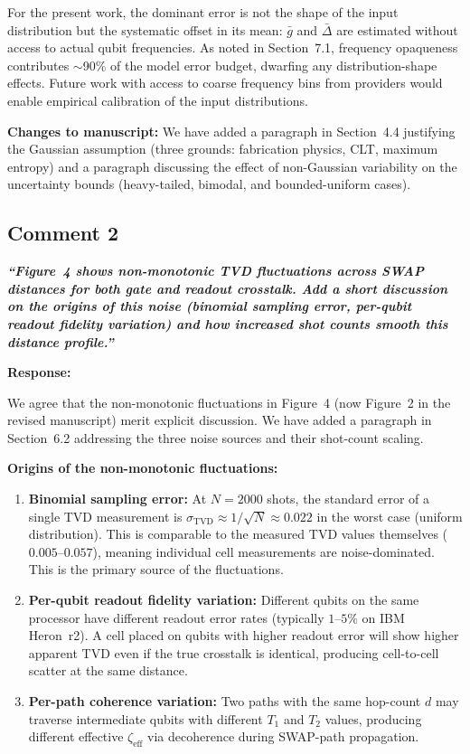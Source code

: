 \documentclass[11pt,a4paper]{article}
\begin{document}
For the present work, the dominant error is not the shape of the input distribution but the
systematic offset in its mean: $\bar{g}$ and $\bar{\Delta}$ are estimated without access to
actual qubit frequencies. As noted in Section~7.1, frequency opaqueness contributes
$\sim$90\% of the model error budget, dwarfing any distribution-shape effects. Future work
with access to coarse frequency bins from providers would enable empirical calibration of
the input distributions.

\medskip\noindent\textbf{Changes to manuscript:} We have added a paragraph in Section~4.4
justifying the Gaussian assumption (three grounds: fabrication physics, CLT, maximum
entropy) and a paragraph discussing the effect of non-Gaussian variability on the
uncertainty bounds (heavy-tailed, bimodal, and bounded-uniform cases).

\subsection*{Comment 2}

\noindent\textbf{\textit{``Figure~4 shows non-monotonic TVD fluctuations across SWAP
distances for both gate and readout crosstalk. Add a short discussion on the origins of
this noise (binomial sampling error, per-qubit readout fidelity variation) and how
increased shot counts smooth this distance profile.''}}

\medskip\noindent\textbf{Response:}

We agree that the non-monotonic fluctuations in Figure~4 (now Figure~2 in the revised
manuscript) merit explicit discussion. We have added a paragraph in Section~6.2 addressing
the three noise sources and their shot-count scaling.

\medskip\noindent\textbf{Origins of the non-monotonic fluctuations:}

\begin{enumerate}[leftmargin=*]
    \item \textbf{Binomial sampling error:} At $N = 2000$ shots, the standard error of a
    single TVD measurement is $\sigma_{\mathrm{TVD}} \approx 1/\sqrt{N} \approx 0.022$ in
    the worst case (uniform distribution). This is comparable to the measured TVD values
    themselves ($0.005$--$0.057$), meaning individual cell measurements are noise-dominated.
    This is the primary source of the fluctuations.
    \item \textbf{Per-qubit readout fidelity variation:} Different qubits on the same
    processor have different readout error rates (typically $1$--$5\%$ on IBM Heron~r2).
    A cell placed on qubits with higher readout error will show higher apparent TVD even if
    the true crosstalk is identical, producing cell-to-cell scatter at the same distance.
    \item \textbf{Per-path coherence variation:} Two paths with the same hop-count $d$ may
    traverse intermediate qubits with different $T_1$ and $T_2$ values, producing different
    effective $\zeta_{\mathrm{eff}}$ via decoherence during SWAP-path propagation.
\end{enumerate}
\end{document}
